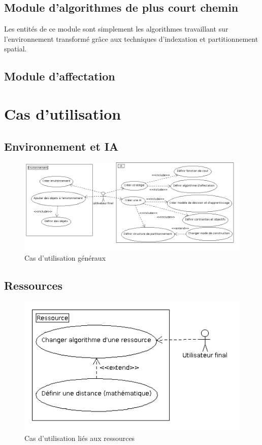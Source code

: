 %
\subsection{Module d'algorithmes de plus court chemin}

Les entités de ce module sont simplement les algorithmes travaillant sur l'environnement transformé grâce aux techniques d'indexation et partitionnement spatial.

%
\subsection{Module d'affectation}

%
\section{Cas d'utilisation}

\subsection{Environnement et IA}
\begin{figure}[!h]\centering
   \includegraphics[scale=0.5]{images/uc_main.png}
   \caption{\label{uc_main} Cas d'utilisation généraux}
\end{figure}
\subsection{Ressources}
\begin{figure}[!h]\centering
   \includegraphics[scale=0.5]{images/uc_ressource.png}
   \caption{\label{uc_main} Cas d'utilisation liés aux ressources}
\end{figure}
